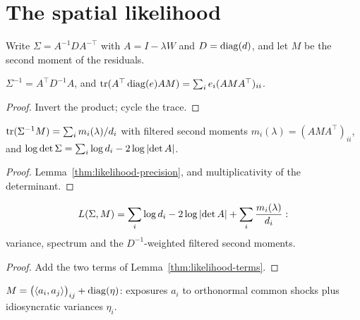 \section{The spatial likelihood}\label{sec:bp-likelihood}

Write $\Sigma=A^{-1}DA^{-\top}$ with $A=I-\lambda W$ and $D=\operatorname{diag}(d)$, and let
$M$ be the second moment of the residuals.

\begin{lemma}[Precision]\label{thm:likelihood-precision}
  \leanok
  $\Sigma^{-1}=A^\top D^{-1}A$, and
  $\operatorname{tr}(A^\top\operatorname{diag}(e)AM)=\sum_ie_i(AMA^\top)_{ii}$.
\end{lemma}
\begin{proof}\leanok
  Invert the product; cycle the trace.
\end{proof}

\begin{lemma}\label{thm:likelihood-terms}
  \leanok
  $\operatorname{tr}(\Sigma^{-1}M)=\sum_im_i(\lambda)/d_i$ with filtered second moments
  $m_i(\lambda)=(AMA^\top)_{ii}$, and
  $\log\det\Sigma=\sum_i\log d_i-2\log\left\lvert\det A\right\rvert$.
\end{lemma}
\begin{proof}\leanok
  Lemma~\ref{thm:likelihood-precision}, and multiplicativity of the
  determinant.
\end{proof}

\begin{theorem}\label{thm:likelihood-loss}
  \leanok
  \[
    L(\Sigma,M)=\sum_i\log d_i-2\log\left\lvert\det A\right\rvert+\sum_i\frac{m_i(\lambda)}{d_i}:
  \]
  variance, spectrum and the $D^{-1}$-weighted filtered second moments.
\end{theorem}
\begin{proof}\leanok
  Add the two terms of Lemma~\ref{thm:likelihood-terms}.
\end{proof}

\begin{definition}\label{def:likelihood-moment}
  \leanok
  $M=\bigl(\left\langle a_i,a_j\right\rangle\bigr)_{ij}+\operatorname{diag}(\eta)$: exposures $a_i$ to orthonormal
  common shocks plus idiosyncratic variances $\eta_i$.
\end{definition}

